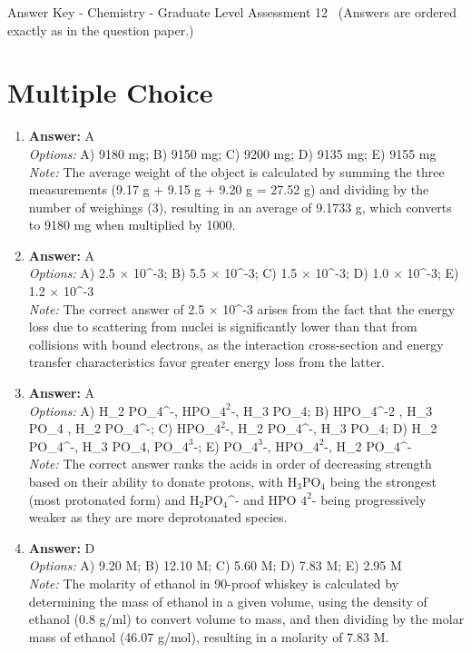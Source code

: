 \documentclass[12pt]{article}
\begin{document}
\begin{center}
Answer Key - Chemistry - Graduate Level Assessment 12 \
\small (Answers are ordered exactly as in the question paper.)
\end{center}

\section*{Multiple Choice}
\begin{enumerate}[label=\arabic*.]
\item \textbf{Answer:} A
\\ \textit{Options:} A) 9180 mg; B) 9150 mg; C) 9200 mg; D) 9135 mg; E) 9155 mg
\\ \textit{Note:} The average weight of the object is calculated by summing the three measurements (9.17 g + 9.15 g + 9.20 g = 27.52 g) and dividing by the number of weighings (3), resulting in an average of 9.1733 g, which converts to 9180 mg when multiplied by 1000.
\item \textbf{Answer:} A
\\ \textit{Options:} A) 2.5 \ensuremath{\times} 10^-3; B) 5.5 \ensuremath{\times} 10^-3; C) 1.5 \ensuremath{\times} 10^-3; D) 1.0 \ensuremath{\times} 10^-3; E) 1.2 \ensuremath{\times} 10^-3
\\ \textit{Note:} The correct answer of 2.5 × 10^-3 arises from the fact that the energy loss due to scattering from nuclei is significantly lower than that from collisions with bound electrons, as the interaction cross-section and energy transfer characteristics favor greater energy loss from the latter.
\item \textbf{Answer:} A
\\ \textit{Options:} A) H\_2 PO\_4^-, HPO\_$4^2$-, H\_3 PO\_4; B) HPO\_4^-2 , H\_3 PO\_4 , H\_2 PO\_4^-; C) HPO\_$4^2$-, H\_2 PO\_4^-, H\_3 PO\_4; D) H\_2 PO\_4^-, H\_3 PO\_4, PO\_$4^3$-; E) PO\_$4^3$-, HPO\_$4^2$-, H\_2 PO\_4^-
\\ \textit{Note:} The correct answer ranks the acids in order of decreasing strength based on their ability to donate protons, with H$_{3}$PO$_{4}$ being the strongest (most protonated form) and H$_{2}$PO$_{4}$^- and HPO $4^2$- being progressively weaker as they are more deprotonated species.
\item \textbf{Answer:} D
\\ \textit{Options:} A) 9.20 M; B) 12.10 M; C) 5.60 M; D) 7.83 M; E) 2.95 M
\\ \textit{Note:} The molarity of ethanol in 90-proof whiskey is calculated by determining the mass of ethanol in a given volume, using the density of ethanol (0.8 g/ml) to convert volume to mass, and then dividing by the molar mass of ethanol (46.07 g/mol), resulting in a molarity of 7.83 M.

\end{enumerate}
\end{document}
